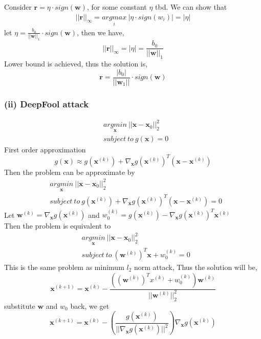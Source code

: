 \documentclass[11pt]{article}
\begin{document}
Consider $\pmb{r}=\eta \cdot sign(\pmb{w})$, for some constant $\eta$ tbd.
We can show that
\begin{equation}
\begin{split}
||\pmb{r}||_\infty = \underset{i}{argmax}\ |\eta\cdot sign(w_i)|=|\eta|
\end{split}
\end{equation}
let $\eta=\frac{b_0}{||\pmb{w}||_1}\cdot sign(\pmb{w})$, then we have,
\begin{equation}
||\pmb{r}||_\infty = |\eta| = \frac{b_0}{||\pmb{w}||_1}
\end{equation}
Lower bound is achieved, thus the solution is,
\begin{equation}
\pmb{r}=\frac{|b_0|}{||\pmb{w}_1||}\cdot sign(\pmb{w})
\end{equation}
\subsubsection*{(ii) DeepFool attack}
\begin{equation}
\begin{split}
&\underset{\pmb{x}}{argmin}\ ||\pmb{x}-\pmb{x}_0||^2_2\\
&subject\ to\ g(\pmb{x})=0
\end{split}
\end{equation}
First order approximation
\begin{equation}
g(\pmb{x})\approx g(\pmb{x}^{(k)})+\nabla_{\pmb{x}}g(\pmb{x}^{(k)})^T(\pmb{x}-\pmb{x}^{(k)})
\end{equation}
Then the problem can be approximate by
\begin{equation}
\begin{split}
&\underset{\pmb{x}}{argmin}\ ||\pmb{x}-\pmb{x}_0||^2_2\\
&subject\ to\ g(\pmb{x}^{(k)})+\nabla_{\pmb{x}}g(\pmb{x}^{(k)})^T(\pmb{x}-\pmb{x}^{(k)})=0
\end{split}
\end{equation}
Let $\pmb{w}^{(k)}=\nabla_{\pmb{x}}g(\pmb{x}^{(k)})$ and $w_0^{(k)}=g(\pmb{x}^{(k)})-\nabla_{\pmb{x}}g(\pmb{x}^{(k)})^T\pmb{x}^{(k)}$\\
Then the problem is equivalent to 
\begin{equation}
\begin{split}
&\underset{\pmb{x}}{argmin}\ ||\pmb{x}-\pmb{x}_0||^2_2\\
&subject\ to\ (\pmb{w}^{(k)})^T\pmb{x}+w_0^{(k)}=0
\end{split}
\end{equation}
This is the same problem as minimum $l_2$ norm attack, Thus the solution will be,
\begin{equation}
\pmb{x}^{(k+1)}=\pmb{x}^{(k)}-\frac{((\pmb{w}^{(k)})^Tx^{(k)} + w_0^{(k)})\pmb{w}^{(k)}}{||\pmb{w}^{(k)}||^2_2}
\end{equation}
substitute $\pmb{w}$ and $w_0$ back, we get
\begin{equation}
\pmb{x}^{(k+1)}=\pmb{x}^{(k)}-\left(\frac{g(\pmb{x}^{(k)})}{||\nabla_{\pmb{x}}g(\pmb{x}^{(k)})||^2}\right)\nabla_{\pmb{x}}g(\pmb{x}^{(k)})
\end{equation}
\end{document}
